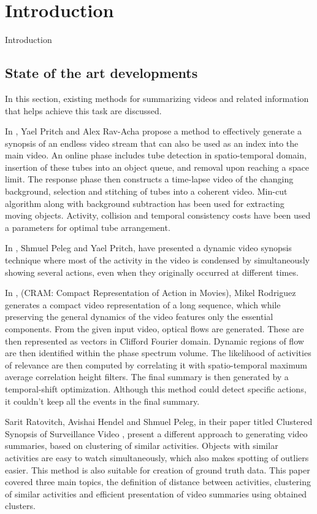 \chapter{Introduction}

Introduction

\section{State of the art developments}

In this section, existing methods for summarizing videos and related information that helps achieve this task are discussed.

In \cite{rav2006making}, Yael Pritch and Alex Rav-Acha propose a method to effectively generate a synopsis of an endless video stream that can also be used as an index into the main video. An online phase includes tube detection in spatio-temporal domain, insertion of these tubes into an object queue, and removal upon reaching a space limit. The response phase then constructs a time-lapse video of the changing background, selection and stitching of tubes into a coherent video. Min-cut algorithm along with background subtraction has been used for extracting moving objects. Activity, collision and temporal consistency costs have been used a parameters for optimal tube arrangement.

In \cite{pritch2008nonchronological}, Shmuel Peleg and Yael Pritch, have presented a dynamic video synopsis technique where most of the activity in the video is condensed by simultaneously showing several actions, even when they originally occurred at different times.

In \cite{rodriguez2010cram}, (CRAM: Compact Representation of Action in Movies), Mikel Rodriguez generates a compact video representation of a long sequence, which while preserving the general dynamics of the video features only the essential components. From the given input video, optical flows are generated. These are then represented as vectors in Clifford Fourier domain. Dynamic regions of flow are then identified within the phase spectrum volume. The likelihood of activities of relevance are then computed by correlating it with spatio-temporal maximum average correlation height filters. The final summary is then generated by a temporal-shift optimization. Although this method could detect specific actions, it couldn’t keep all the events in the final summary.

Sarit Ratovitch, Avishai Hendel and Shmuel Peleg, in their paper titled Clustered Synopsis of Surveillance Video \cite{pritch2009clustered}, present a different approach to generating video summaries, based on clustering of similar activities. Objects with similar activities are easy to watch simultaneously, which also makes spotting of outliers easier. This method is also suitable for creation of ground truth data. This paper covered three main topics, the definition of distance between activities, clustering of similar activities and efficient presentation of video summaries using obtained clusters.

